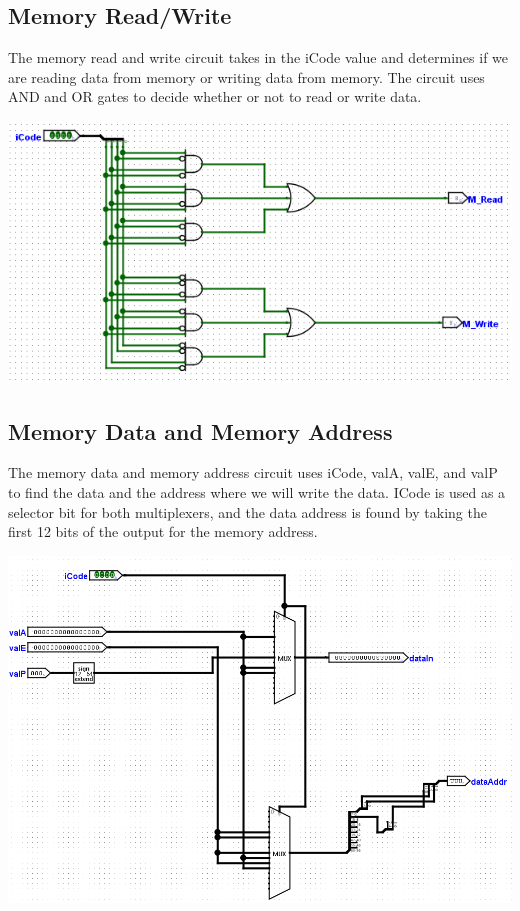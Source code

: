 \documentclass{article}
\begin{document}
\subsection{Memory Read/Write}
The memory read and write circuit takes in the iCode value and determines if we are reading data from memory or writing data from memory. The circuit uses AND and OR gates to decide whether or not to read or write data. 
\begin{center}
    \includegraphics[scale=.8]{memreadwrite.png} \\
\end{center}
\pagebreak
\subsection{Memory Data and Memory Address}
The memory data and memory address circuit uses iCode, valA, valE, and valP to find the data and the address where we will write the data. ICode is used as a selector bit for both multiplexers, and the data address is found by taking the first 12 bits of the output for the memory address.
\begin{center}
    \includegraphics[scale=.6]{memaddrdata.png} \\
\end{center}
\pagebreak
\end{document}

